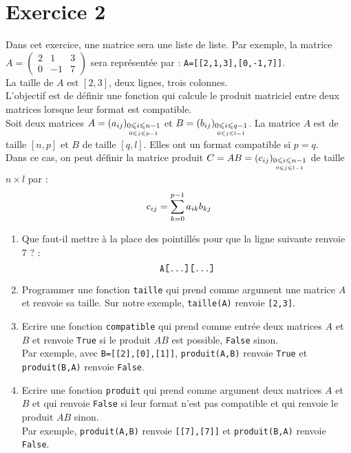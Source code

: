 \documentclass[a4paper,12pt]{article}
\begin{document}
\section*{Exercice 2}
\noi Dans cet exercice, une matrice sera une liste de liste. Par exemple, la matrice $A=\begin{pmatrix}
2&1&3\\0&-1&7
\end{pmatrix}$ sera représentée par : \verb?A=[[2,1,3],[0,-1,7]]?. \\
La taille de $A$ est $[2,3]$, deux lignes, trois colonnes.\\
L'objectif est de définir une fonction qui calcule le produit matriciel entre deux matrices lorsque leur format est compatible.\\
Soit deux matrices $A=(a_{ij})_{\underset{0\leqslant j\leqslant p-1}{0\leqslant i\leqslant n-1}}$ et $B=(b_{ij})_{\underset{0\leqslant j\leqslant l-1}{0\leqslant i\leqslant q-1}}$. La matrice $A$ est de taille $[n,p]$ et $B$ de taille $[q,l]$. Elles ont un format compatible si $p=q$. \\
Dans ce cas, on peut définir la matrice produit $C=AB=(c_{ij})_{\underset{0\leqslant j\leqslant l-1}{0\leqslant i\leqslant n-1}}$ de taille $n\times l$ par :
\[c_{ij}=\displaystyle \sum_{k=0}^{p-1}a_{ik}b_{kj}\]
\begin{enumerate}
\item Que faut-il mettre à la place des pointillés pour que la ligne suivante renvoie 7 ? : 
\[\verb?A[...][...]?\]
\item Programmer une fonction \verb?taille? qui prend comme argument une matrice $A$ et renvoie sa taille. Sur notre exemple, \verb?taille(A)? renvoie \verb?[2,3]?.
\item Ecrire une fonction \verb?compatible? qui prend comme entrée deux matrices $A$ et $B$ et renvoie \verb?True? si le produit $AB$ est possible, \verb?False? sinon.\\
Par exemple, avec \verb?B=[[2],[0],[1]]?, \verb?produit(A,B)? renvoie \verb?True? et \verb?produit(B,A)? renvoie \verb?False?.
\item Ecrire une fonction \verb?produit? qui prend comme argument deux matrices $A$ et $B$ et qui renvoie \verb?False? si leur format n'est pas compatible et qui renvoie le produit $AB$ sinon.\\
Par exemple, \verb?produit(A,B)? renvoie \verb?[[7],[7]]? et \verb?produit(B,A)? renvoie \verb?False?.
\end{enumerate}
\end{document}
